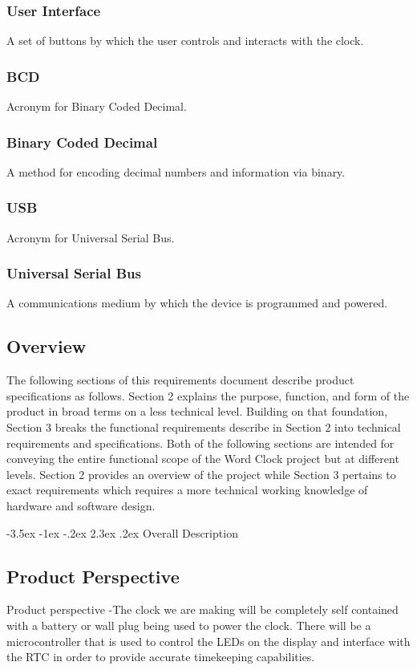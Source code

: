 \documentclass[10pt,draftclsnofoot,onecolumn]{IEEEtran}
\makeatletter
\renewcommand\section{\@startsection {section}{1}{\z@}%
                                   {-3.5ex \@plus -1ex \@minus -.2ex}%
                                   {2.3ex \@plus.2ex}%
                                   {\normalfont\LARGE\bfseries}}%
\makeatother
\begin{document}
\subsubsection {User Interface} A set of buttons by which the user controls and interacts with the clock.
\subsubsection {BCD} Acronym for Binary Coded Decimal.
\subsubsection {Binary Coded Decimal} A method for encoding decimal numbers and information via binary.
\subsubsection {USB} Acronym for Universal Serial Bus.
\subsubsection {Universal Serial Bus} A communications medium by which the device is programmed and  powered.

\subsection{Overview}
The following sections of this requirements document describe product specifications as follows.
Section 2 explains the purpose, function, and form of the product in broad terms on a less
technical level. Building on that foundation, Section 3 breaks the functional requirements
describe in Section 2 into technical requirements and specifications.
	Both of the following sections are intended for conveying the entire functional
scope of the Word Clock project but at different levels. Section 2 provides an overview of the
project while Section 3 pertains to exact requirements which requires a more technical working
knowledge of hardware and software design.

\newpage
\section{Overall Description}
\subsection{Product Perspective}
Product perspective -The clock we are making will be completely self contained with a battery
or wall plug being used to power the clock. There will be a microcontroller that is used to
control the LEDs on the display and interface with the RTC in order to provide accurate
timekeeping capabilities.
\end{document}
